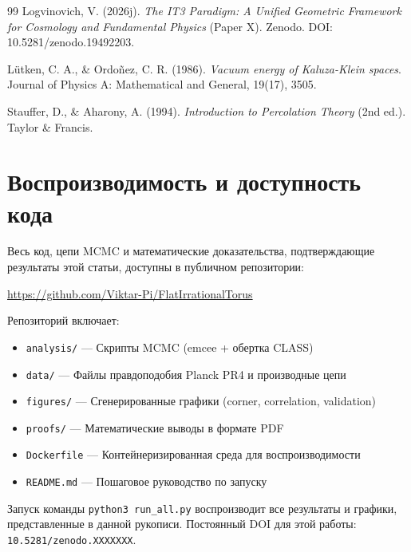 \documentclass[11pt,a4paper]{article}
\begin{document}
\begin{thebibliography}{99}
Logvinovich, V. (2026j). \textit{The IT3 Paradigm: A Unified Geometric Framework for Cosmology and Fundamental Physics} (Paper X). Zenodo. DOI: 10.5281/zenodo.19492203.

L\"utken, C. A., \& Ordo\~nez, C. R. (1986). \textit{Vacuum energy of Kaluza-Klein spaces}. Journal of Physics A: Mathematical and General, 19(17), 3505.

Stauffer, D., \& Aharony, A. (1994). \textit{Introduction to Percolation Theory} (2nd ed.). Taylor \& Francis.

\end{thebibliography}

\appendix
\section{Воспроизводимость и доступность кода}
\label{app:reproducibility}

Весь код, цепи MCMC и математические доказательства, подтверждающие результаты этой статьи, доступны в публичном репозитории:
\begin{center}
\url{https://github.com/Viktar-Pi/FlatIrrationalTorus}
\end{center}
Репозиторий включает:
\begin{itemize}
    \item \texttt{analysis/} --- Скрипты MCMC (emcee + обертка CLASS)
    \item \texttt{data/} --- Файлы правдоподобия Planck PR4 и производные цепи
    \item \texttt{figures/} --- Сгенерированные графики (corner, correlation, validation)
    \item \texttt{proofs/} --- Математические выводы в формате PDF
    \item \texttt{Dockerfile} --- Контейнеризированная среда для воспроизводимости
    \item \texttt{README.md} --- Пошаговое руководство по запуску
\end{itemize}
Запуск команды \texttt{python3 run\_all.py} воспроизводит все результаты и графики, представленные в данной рукописи. Постоянный DOI для этой работы: \texttt{10.5281/zenodo.XXXXXXX}.
\end{document}
